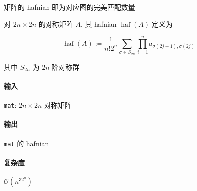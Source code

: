 矩阵的 hafnian 即为对应图的完美匹配数量

对 \(2n\times 2n\) 的对称矩阵 \(A\), 其 hafnian \(\operatorname{haf}(A)\) 定义为

\[
    \operatorname{haf}(A):=\frac{1}{n!2^n}\sum_{\sigma\in S_{2n}}\prod_{i=1}^n a_{\sigma(2j-1),\sigma(2j)}
\]

其中 \(S_{2n}\) 为 \(2n\) 阶对称群

\paragraph{输入}

\verb|mat|: \(2n\times 2n\) 对称矩阵

\paragraph{输出}

\verb|mat| 的 hafnian

\paragraph{复杂度}

\(\mathcal{O}(n^32^n)\)
